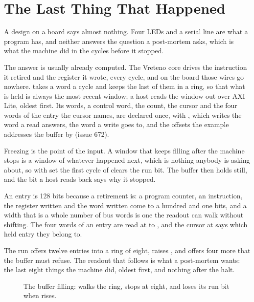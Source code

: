 \section{The Last Thing That Happened}
\label{sec:x-tracer}

A design on a board says almost nothing. Four LEDs and a serial line
are what a program has, and neither answers the question a post-mortem
asks, which is what the machine did in the cycles before it stopped.

The answer is usually already computed. The Vreteno core drives the
instruction it retired and the register it wrote, every cycle, and on
the board those wires go nowhere.  takes a word a
cycle and keeps the last  of them in a ring, so that what is
held is always the most recent window; a host reads the window out
over AXI-Lite, oldest first.
Its words, a control word, the count, the cursor and the four words of
the entry the cursor names, are declared once, with ,
which writes the word a read answers, the word a write goes to, and
the offsets the example addresses the buffer by (issue 672).

Freezing is the point of the  input. A window that keeps
filling after the machine stops is a window of whatever happened next,
which is nothing anybody is asking about, so with 
set the first cycle of  clears the run bit. The buffer then
holds still, and the bit a host reads back says why it stopped.

An entry is 128 bits because a retirement is: a program counter, an
instruction, the register written and the word written come to a
hundred and one bits, and a width that is a whole number of bus words
is one the readout can walk without shifting. The four words of an
entry are read at  to , and the cursor at
 says which held entry they belong to.

The run offers twelve entries into a ring of eight, raises
, and offers four more that the buffer must refuse. The
readout that follows is what a post-mortem wants: the last eight
things the machine did, oldest first, and nothing after the halt.

\begin{figure}[htbp]
\centering

\caption{The buffer filling:  walks the ring, 
stops at eight, and  loses its run bit when 
rises.}
\label{fig:x-tracer}
\end{figure}




